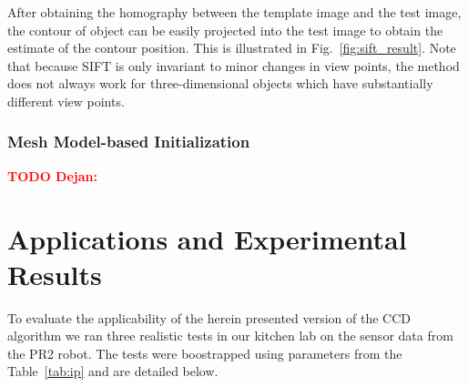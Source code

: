 \documentclass[conference]{IEEEtran}
\newcommand{\todod}[1]{\textbf{\textcolor{red}{TODO Dejan: #1}}}
\begin{document}
After obtaining the homography between the template image and the
test image, the contour of object can be easily projected
into the test image to obtain the estimate of the contour
position. This is illustrated in Fig.~\ref{fig:sift_result}. Note that because SIFT is only invariant
to minor changes in view points, the method does not always work for
three-dimensional objects which have substantially different view points.

\subsubsection{Mesh Model-based Initialization}
\label{sec:pcl}
\todod{}


\section{Applications and Experimental Results}
\label{sec:results}
To evaluate the applicability of the herein presented version of the CCD algorithm
we ran three realistic tests in our kitchen lab on the sensor data from the 
PR2 robot. The tests were boostrapped using parameters from
the Table~\ref{tab:ip} and are detailed below.

\begin{table}[htbp]
\large
\centering
{}
\caption{initialization parameters}
\label{tab:ip}
\end{table}
\end{document}
